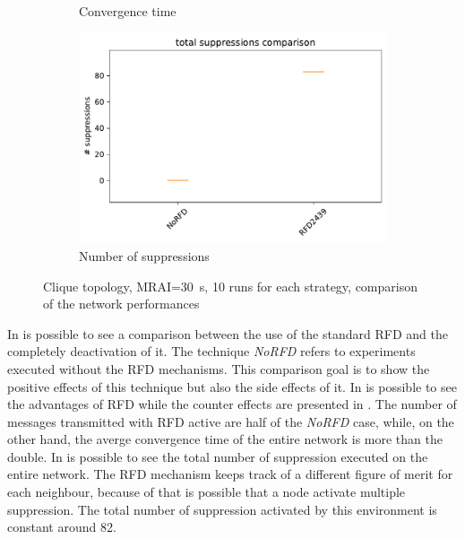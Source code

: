 \begin{figure}[h]
\begin{subfigure}[b]{0.49\textwidth}
         \caption{Convergence time}
         \label{fig:RFD_2439_clique_MRAI30_convTime}
     \end{subfigure}
     \hfill
     \begin{subfigure}[b]{0.49\textwidth}
         \centering
         \includegraphics[width=\textwidth]{images/RFD/clique/clique_rfd_comparison_2439_suppressions_boxplot.pdf}
         \caption{Number of suppressions}
         \label{fig:RFD_2439_clique_MRAI30_suppressions}
     \end{subfigure}
		\caption{Clique topology, \ac{MRAI}=\SI{30}{\second}, \num{10} runs for each strategy,
				comparison of the network performances}
        \label{fig:RFD_2439_MRAI30}
\end{figure}

In  is possible to see a comparison between the use
of the standard \ac{RFD} and the completely deactivation of it.
The technique \textit{NoRFD} refers to experiments executed without the
\ac{RFD} mechanisms.
This comparison goal is to show the positive effects of this technique but also
the side effects of it.
In  is possible to see the advantages
of \ac{RFD} while the counter effects are presented in .
The number of messages transmitted with \ac{RFD} active are half of the \textit{NoRFD}
case, while, on the other hand, the averge convergence time of the entire network
is more than the double.
In  is possible to see the total
number of suppression executed on the entire network.
The \ac{RFD} mechanism keeps track of a different figure of merit for each neighbour,
because of that is possible that a node activate multiple suppression.
The total number of suppression activated by this environment is constant around
\num{82}.

